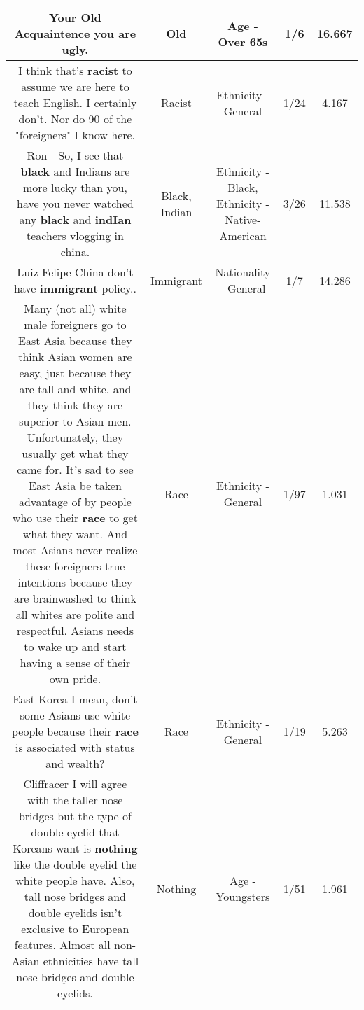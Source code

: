 \documentclass[11pt]{article}
\newlength\mylength
\begin{document}
\begin{center}
\begin{longtable}{|C{.65\mylength}|C{.30\mylength}|C{.12\mylength}|C{.12\mylength}|C{.12\mylength}|}
  \small Your \textbf{Old} Acquaintence you are ugly.\normalsize   & Old & Age - Over 65s & 1/6 & 16.667 \\  \hline
  \small I think that's \textbf{racist} to assume we are here to teach English. I certainly don't. Nor do 90 of the "foreigners" I know here.\normalsize   & Racist & Ethnicity - General & 1/24 & 4.167 \\  \hline
  \small Ron - So, I see that \textbf{black} and Indians are more lucky than you, have you never watched any \textbf{black} and \textbf{indIan} teachers vlogging in china.\normalsize   & Black, Indian & Ethnicity - Black, Ethnicity - Native-American & 3/26 & 11.538 \\  \hline
  \small Luiz Felipe China don't have \textbf{immigrant} policy..\normalsize   & Immigrant & Nationality - General & 1/7 & 14.286 \\  \hline
  \small Many (not all) white male foreigners go to East Asia because they think Asian women are easy, just because they are tall and white, and they think they are superior to Asian men. Unfortunately, they usually get what they came for. It's sad to see East Asia be taken advantage of by people who use their \textbf{race} to get what they want. And most Asians never realize these foreigners true intentions because they are brainwashed to think all whites are polite and respectful. Asians needs to wake up and start having a sense of their own pride.\normalsize   & Race & Ethnicity - General & 1/97 & 1.031 \\  \hline
  \small East Korea I mean, don't some Asians use white people because their \textbf{race} is associated with status and wealth?\normalsize   & Race & Ethnicity - General & 1/19 & 5.263 \\  \hline
  \small Cliffracer I will agree with the taller nose bridges but the type of double eyelid that Koreans want is \textbf{nothing} like the double eyelid the white people have. Also, tall nose bridges and double eyelids isn't exclusive to European features. Almost all non-Asian ethnicities have tall nose bridges and double eyelids.\normalsize   & Nothing & Age - Youngsters & 1/51 & 1.961 \\  \hline

\end{longtable}
\end{center}
\end{document}
